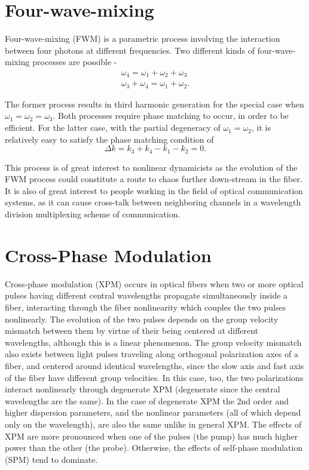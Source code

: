 \section{Four-wave-mixing}

Four-wave-mixing (FWM) \cite{Agrawal10} is a parametric process involving
the interaction
between four photons at different frequencies. Two different kinds of
four-wave-mixing processes are possible -
\begin{eqnarray}
\omega_4 = \omega_1 + \omega_2 + \omega_3 \\
\omega_3 + \omega_4 = \omega_1 + \omega_2 .
\end{eqnarray}

The former process results in third harmonic generation for the special case
when $\omega_1 = \omega_2 = \omega_3$. Both processes require phase
matching to occur, in order to be efficient. For the latter case, with
the partial degeneracy of $\omega_1 = \omega_2$, it is relatively easy
to satisfy the phase matching condition of
\begin{equation}
\Delta k = k_3 + k_4 - k_1 - k_2 = 0 .
\end{equation}

This process is of great interest to nonlinear dynamicists as the
evolution of the FWM process could constitute a route to chaos further
down-stream in the fiber. It is also of great interest to people working in
the field of optical communication systems, as it can cause cross-talk
between neighboring channels in a wavelength division multiplexing scheme
of communication.

\section{Cross-Phase Modulation}

Cross-phase modulation (XPM) \cite{Agrawal7} occurs in optical fibers when
two or more optical pulses having different central wavelengths propagate 
simultaneously inside a fiber, interacting through the fiber
nonlinearity which couples the two pulses nonlinearly.  The evolution of the
two pulses depends on the group velocity mismatch between them by virtue of 
their being centered at different wavelengths, although this is a linear
phenomenon. The group velocity mismatch also exists between light pulses
traveling along orthogonal polarization axes of a fiber, and centered around
identical wavelengths, since the slow axis and fast axis of the fiber have
different group velocities. In this case, too, the two polarizations interact
nonlinearly \cite{Agrawal6} through degenerate XPM (degenerate since the
central wavelengths are the same). In the case of degenerate XPM the 2nd order 
and higher dispersion parameters, and the nonlinear parameters (all of which
depend only on the wavelength), are also the same unlike in general XPM. The 
effects of XPM are more pronounced when one of the pulses (the pump) has much 
higher power than the other (the probe). Otherwise, the effects of self-phase 
modulation (SPM) tend to dominate.

